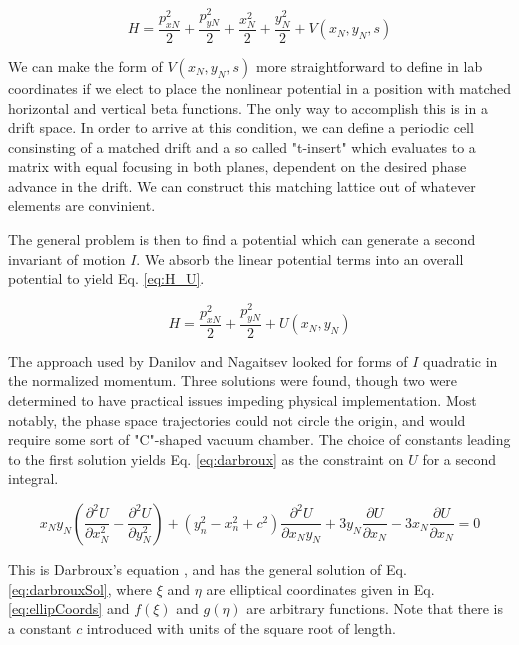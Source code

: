 \begin{equation} \label{eq:H_norm}
	H = \frac{p_{xN}^2}{2} + \frac{p_{yN}^2}{2}  + \frac{x_{N}^2}{2} + \frac{y_{N}^2}{2} + V(x_N,y_N,s)
\end{equation}

We can make the form of $V(x_N,y_N,s)$ more straightforward to define in lab coordinates if we elect to place the nonlinear potential in a position with matched horizontal and vertical beta functions. The only way to accomplish this is in a drift space. In order to arrive at this condition, we can define a periodic cell consinsting of a matched drift and a so called "t-insert" which evaluates to a matrix with equal focusing in both planes, dependent on the desired phase advance in the drift. We can construct this matching lattice out of whatever elements are convinient. 

The general problem is then to find a potential which can generate a second invariant of motion $I$. We absorb the linear potential terms into an overall potential to yield Eq. \ref{eq:H_U}. 

\begin{equation} \label{eq:H_U}
	H = \frac{p_{xN}^2}{2} + \frac{p_{yN}^2}{2} + U(x_N,y_N)
\end{equation}

The approach used by Danilov and Nagaitsev looked for forms of $I$ quadratic in the normalized momentum. Three solutions were found, though two were determined to have practical issues impeding physical implementation. Most notably, the phase space trajectories could not circle the origin, and would require some sort of "C"-shaped vacuum chamber. The choice of constants leading to the first solution yields Eq. \ref{eq:darbroux} as the constraint on $U$ for a second integral.

\begin{equation} \label{eq:darbroux}
	x_N y_N\left( \frac{\partial^2 U}{\partial x_N^2} - \frac{\partial^2 U}{\partial y_N^2}\right) + (y_n^2 - x_n^2 + c^2)\frac{\partial^2 U}{\partial x_N y_N} + 3y_N \frac{\partial U}{\partial x_N} - 3 x_N \frac{\partial U}{\partial x_N} = 0
\end{equation}

This is Darbroux's equation \cite{Darbroux}, and has the general solution of Eq. \ref{eq:darbrouxSol}, where $\xi$ and $\eta$ are elliptical coordinates given in Eq. \ref{eq:ellipCoords} and $f(\xi)$ and $g(\eta)$ are arbitrary functions. Note that there is a constant $c$ introduced with units of the square root of length.

